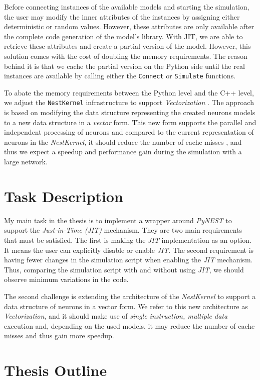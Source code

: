 Before connecting instances of the available models  and starting the simulation, the user may modify the inner attributes of the instances by assigning either deterministic or random values. However, these attributes are only available after the complete code generation of the model's library. With JIT, we are able to retrieve these attributes and create a partial version of the model. However, this solution comes with the cost of doubling the memory requirements. The reason behind it is that we cache the partial version on the Python side until the real instances are available by calling either the \texttt{Connect} or \texttt{Simulate} functions.

To abate the memory requirements between the Python level and the C++ level, we adjust the \texttt{NestKernel} infrastructure to support \emph{Vectorization} \citep{nuzman2006auto}. The approach is based on modifying the data structure representing the created neurons models to a new data structure in a \emph{vector} form. This new form supports the parallel and independent processing of neurons and compared to the current representation of neurons in the \emph{NestKernel}, it should reduce the number of cache misses \citep{ghosh1997cache}, and thus we expect a speedup and performance gain during the simulation with a large network.

\section{Task Description}
My main task in the thesis is to implement a wrapper around \emph{PyNEST} to support the \emph{Just-in-Time (JIT)} mechanism. They are two main requirements that must be satisfied. The first is making the \emph{JIT} implementation as an option. It means the user can explicitly disable or enable \emph{JIT}. The second requirement is having fewer changes in the simulation script when enabling the \emph{JIT} mechanism. Thus, comparing the simulation script with and without using \emph{JIT}, we should observe minimum variations in the code.

The second challenge is extending the architecture of the \emph{NestKernel} to support a data structure of neurons in a vector form. We refer to this new architecture as \emph{Vectorization}, and it should make use of \emph{single instruction, multiple data} execution and, depending on the used models, it may reduce the number of cache misses and thus gain more speedup.
\section{Thesis Outline}


